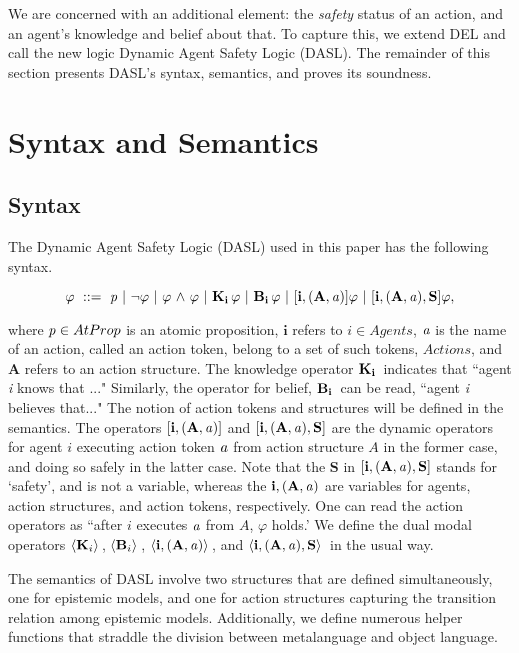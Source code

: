 We are concerned with an additional element: the \emph{safety} status of an action, and an agent's knowledge and belief about that. To capture this, we extend DEL and call the new logic Dynamic Agent Safety Logic (DASL). The remainder of this section presents DASL's syntax, semantics, and proves its soundness. 
\section{Syntax and Semantics}
\subsection{Syntax}
The Dynamic Agent Safety Logic (DASL) used in this paper has the following syntax.
\begin{tcolorbox}
	$$ \varphi \ ::=\   \mathit{p}  \ |\  {\neg} \varphi \ |\  \varphi {\ \wedge \ } \varphi  \ |\  \mathbf{K}_{\mathbf{i}}\, \varphi \ |\  \mathbf{B}_{\mathbf{i}}\,\varphi \ |\  \mathbf{[{i, (A,\mathit{a})}]}\varphi \ |\  \mathbf{[{i, (A,\mathit{a}),S}]}\varphi,$$
\end{tcolorbox}
where $\mathit{p} \in AtProp$ is an atomic proposition, $\mathbf{i}$ refers to $i \in Agents$, $\mathbf{\mathit{a}}$ is the name of an action, called an action token, belong to a set of such tokens, $Actions$, and $\mathbf{A}$ refers to an action structure. The knowledge operator $\mathbf{K}_{\mathbf{i}}\,$ indicates that ``agent \emph{i} knows that ..." Similarly, the operator for belief, $\mathbf{B}_{\mathbf{i}}\,$ can be read, ``agent \emph{i} believes that..." The notion of action tokens and structures will be defined in the semantics. The operators $\mathbf{[{i,(A,\mathit{a})}]}$ and $\mathbf{[{i,(A,\mathit{a}),S}]}$ are the dynamic operators for agent $i$ executing action token $\mathit{a}$ from action structure $A$ in the former case, and doing so safely in the latter case. Note that the $\mathbf{S}$ in $\mathbf{[{i,(A,\mathit{a}),S}]}$ stands for `safety', and is not a variable, whereas the $\mathbf{i,(A,\mathit{a})}$ are variables for agents, action structures, and action tokens, respectively. One can read the action operators as ``after $i$ executes $\mathit{a}$ from $A$, $\varphi$ holds.' We define the dual modal operators $\langle \mathbf{K}_{i} \rangle\,$, $\langle \mathbf{B}_{i} \rangle\,$, $\mathbf{\langle i, (A,\mathit{a}) \rangle}\,$, and $\mathbf{\langle i, (A,\mathit{a}),\mathbf{S} \rangle}\,$ in the usual way. 

The semantics of DASL involve two structures that are defined simultaneously, one for epistemic models, and one for action structures capturing the transition relation among epistemic models. Additionally, we define numerous helper functions that straddle the division between metalanguage and object language. 

